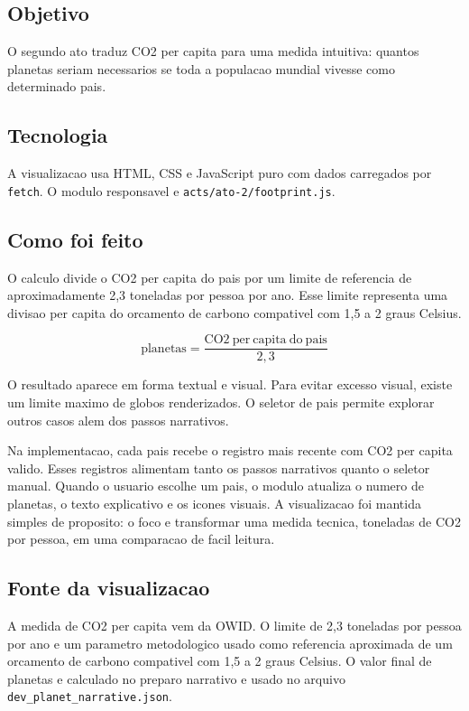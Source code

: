\documentclass[12pt,a4paper]{article}
\begin{document}
\subsection{Objetivo}

O segundo ato traduz CO2 per capita para uma medida intuitiva: quantos planetas seriam necessarios se toda a populacao mundial vivesse como determinado pais.

\subsection{Tecnologia}

A visualizacao usa HTML, CSS e JavaScript puro com dados carregados por \texttt{fetch}. O modulo responsavel e \texttt{acts/ato-2/footprint.js}.

\subsection{Como foi feito}

O calculo divide o CO2 per capita do pais por um limite de referencia de aproximadamente 2,3 toneladas por pessoa por ano. Esse limite representa uma divisao per capita do orcamento de carbono compativel com 1,5 a 2 graus Celsius.

\[
\mathrm{planetas} = \frac{\mathrm{CO2\ per\ capita\ do\ pais}}{2{,}3}
\]

O resultado aparece em forma textual e visual. Para evitar excesso visual, existe um limite maximo de globos renderizados. O seletor de pais permite explorar outros casos alem dos passos narrativos.

Na implementacao, cada pais recebe o registro mais recente com CO2 per capita valido. Esses registros alimentam tanto os passos narrativos quanto o seletor manual. Quando o usuario escolhe um pais, o modulo atualiza o numero de planetas, o texto explicativo e os icones visuais. A visualizacao foi mantida simples de proposito: o foco e transformar uma medida tecnica, toneladas de CO2 por pessoa, em uma comparacao de facil leitura.

\subsection{Fonte da visualizacao}

A medida de CO2 per capita vem da OWID. O limite de 2,3 toneladas por pessoa por ano e um parametro metodologico usado como referencia aproximada de um orcamento de carbono compativel com 1,5 a 2 graus Celsius. O valor final de planetas e calculado no preparo narrativo e usado no arquivo \texttt{dev\_planet\_narrative.json}.
\end{document}
